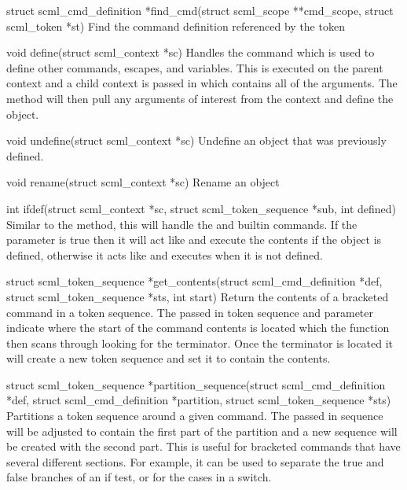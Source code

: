 \begin{cprototypelist}
  \item[struct scml_cmd_definition *find_cmd(struct scml_scope
  **cmd_scope, struct scml_token *st)] Find the command definition referenced
  by the token

  \item[void define(struct scml_context *sc)] Handles the
   command which is used to define other commands, escapes,
  and variables.  This is executed on the parent context and a child context is
  passed in which contains all of the arguments.  The method will then pull any
  arguments of interest from the  context and define the
  object.

  \item[void undefine(struct scml_context *sc)] Undefine an object
  that was previously defined.

  \item[void rename(struct scml_context *sc)] Rename an object

  \item[int ifdef(struct scml_context *sc, struct
  scml_token_sequence *sub, int defined)] Similar to the 
  method, this will handle the  and  builtin
  commands.  If the  parameter is true then it will act
  like  and execute the contents if the object is defined,
  otherwise it acts like  and executes when it is not defined.

  \item[struct scml_token_sequence *get_contents(struct
  scml_cmd_definition *def, struct scml_token_sequence *sts, int start)]
  Return the contents of a bracketed command in a token sequence.  The passed
  in token sequence and  parameter indicate where the start
  of the command contents is located which the function then scans through
  looking for the terminator.  Once the terminator is located it will create a
  new token sequence and set it to contain the contents.

  \item[struct scml_token_sequence *partition_sequence(struct
  scml_cmd_definition *def, struct scml_cmd_definition *partition, struct
  scml_token_sequence *sts)] Partitions a token sequence around a given
  command.  The passed in sequence will be adjusted to contain the first part
  of the partition and a new sequence will be created with the second part.
  This is useful for bracketed commands that have several different sections.
  For example, it can be used to separate the true and false branches of an if
  test, or for the cases in a switch.


\end{cprototypelist}
